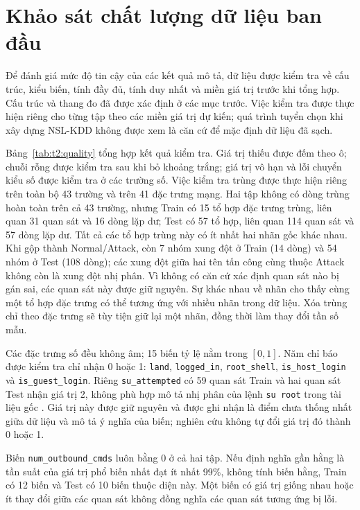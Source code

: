 \documentclass[../main.tex]{subfiles}
\begin{document}
\section{Khảo sát chất lượng dữ liệu ban đầu}
Để đánh giá mức độ tin cậy của các kết quả mô tả, dữ liệu được kiểm tra về cấu trúc, kiểu biến, tính đầy đủ, tính duy nhất và miền giá trị trước khi tổng hợp. Cấu trúc và thang đo đã được xác định ở các mục trước. Việc kiểm tra được thực hiện riêng cho từng tập theo các miền giá trị dự kiến; quá trình tuyển chọn khi xây dựng NSL-KDD không được xem là căn cứ để mặc định dữ liệu đã sạch.

Bảng~\ref{tab:t2:quality} tổng hợp kết quả kiểm tra. Giá trị thiếu được đếm theo ô; chuỗi rỗng được kiểm tra sau khi bỏ khoảng trắng; giá trị vô hạn và lỗi chuyển kiểu số được kiểm tra ở các trường số. Việc kiểm tra trùng được thực hiện riêng trên toàn bộ 43 trường và trên 41 đặc trưng mạng.
Hai tập không có dòng trùng hoàn toàn trên cả 43 trường, nhưng Train có 15 tổ hợp đặc trưng trùng, liên quan 31 quan sát và 16 dòng lặp dư; Test có 57 tổ hợp, liên quan 114 quan sát và 57 dòng lặp dư. Tất cả các tổ hợp trùng này có ít nhất hai nhãn gốc khác nhau. Khi gộp thành Normal/Attack, còn 7 nhóm xung đột ở Train (14 dòng) và 54 nhóm ở Test (108 dòng); các xung đột giữa hai tên tấn công cùng thuộc Attack không còn là xung đột nhị phân. Vì không có căn cứ xác định quan sát nào bị gán sai, các quan sát này được giữ nguyên. Sự khác nhau về nhãn cho thấy cùng một tổ hợp đặc trưng có thể tương ứng với nhiều nhãn trong dữ liệu. Xóa trùng chỉ theo đặc trưng sẽ tùy tiện giữ lại một nhãn, đồng thời làm thay đổi tần số mẫu.

Các đặc trưng số đều không âm; 15 biến tỷ lệ nằm trong $[0,1]$. Năm chỉ báo được kiểm tra chỉ nhận 0 hoặc 1: \texttt{land}, \texttt{logged\_in}, \texttt{root\_shell}, \texttt{is\_host\_login} và \texttt{is\_guest\_login}. Riêng \texttt{su\_attempted} có 59 quan sát Train và hai quan sát Test nhận giá trị 2, không phù hợp mô tả nhị phân của lệnh \texttt{su root} trong tài liệu gốc \cite{task2_kdd1999}. Giá trị này được giữ nguyên và được ghi nhận là điểm chưa thống nhất giữa dữ liệu và mô tả ý nghĩa của biến; nghiên cứu không tự đổi giá trị đó thành 0 hoặc 1.

Biến \texttt{num\_outbound\_cmds} luôn bằng 0 ở cả hai tập. Nếu định nghĩa gần hằng là tần suất của giá trị phổ biến nhất đạt ít nhất 99\%, không tính biến hằng, Train có 12 biến và Test có 10 biến thuộc diện này. Một biến có giá trị giống nhau hoặc ít thay đổi giữa các quan sát không đồng nghĩa các quan sát tương ứng bị lỗi.
\end{document}
